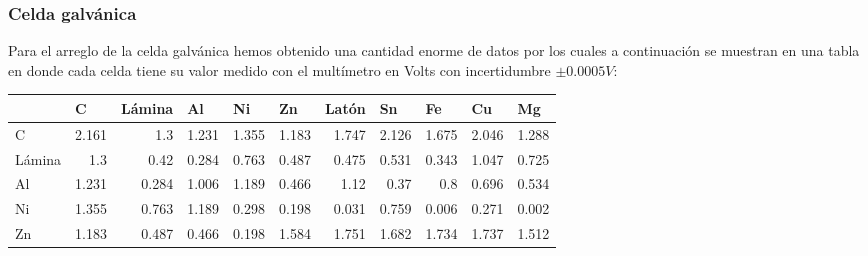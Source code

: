 \documentclass[article,12pt]{elsarticle}
\begin{document}
\subsubsection{Celda galvánica}
Para el arreglo de la celda galvánica hemos obtenido una cantidad enorme de datos por los cuales a continuación se muestran en una tabla en donde cada celda tiene su valor medido con el multímetro en Volts con incertidumbre $\pm 0.0005V$: \\

\begin{table}[h]
\begin{tabular}{|l|r|r|r|r|r|r|r|r|r|r|}
\hline
  & \multicolumn{1}{l|}{C} & \multicolumn{1}{l|}{Lámina} & \multicolumn{1}{l|}{Al} & \multicolumn{1}{l|}{Ni} & \multicolumn{1}{l|}{Zn} & \multicolumn{1}{l|}{Latón} & \multicolumn{1}{l|}{Sn} & \multicolumn{1}{l|}{Fe} & \multicolumn{1}{l|}{Cu} & \multicolumn{1}{l|}{Mg} \\ \hline
\rowcolor[HTML]{D9D9D9} 
C   & 2.161                       & 1.3                         & 1.231                         & 1.355                       & 1.183                     & 1.747                      & 2.126                       & 1.675                       & 2.046                      & 1.288                         \\ \hline
Lámina   & 1.3                         & 0.42                        & 0.284                         & 0.763                       & 0.487                     & 0.475                      & 0.531                       & 0.343                       & 1.047                      & 0.725                         \\ \hline
\rowcolor[HTML]{D9D9D9} 
Al & 1.231                       & 0.284                       & 1.006                         & 1.189                       & 0.466                     & 1.12                       & 0.37                        & 0.8                         & 0.696                      & 0.534                         \\ \hline
Ni   & 1.355                       & 0.763                       & 1.189                         & 0.298                       & 0.198                     & 0.031                      & 0.759                       & 0.006                       & 0.271                      & 0.002                         \\ \hline
\rowcolor[HTML]{D9D9D9} 
Zn     & 1.183                       & 0.487                       & 0.466                         & 0.198                       & 1.584                     & 1.751                      & 1.682                       & 1.734                       & 1.737                      & 1.512                         \\ \hline

\end{tabular}
\end{table}
\end{document}
